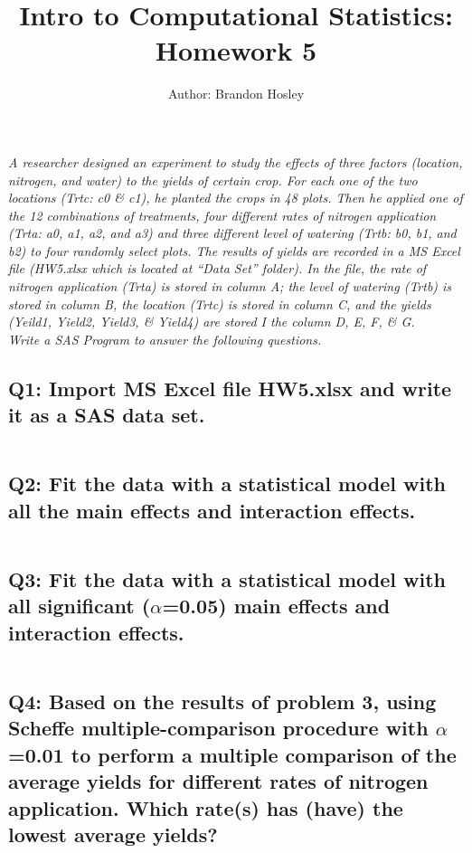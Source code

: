 \documentclass[a4paper,man,natbib]{apa6}
\title{Intro to Computational Statistics: Homework 5}
\author{Author: Brandon Hosley}
\affiliation{Instructor: Liang Kong, Ph.D}
\begin{document}
\maketitle
\singlespacing

\emph{A researcher designed an experiment to study the effects of three factors (location, nitrogen, and water) to the yields of certain crop. For each one of the two locations (Trtc: c0 \& c1), he planted the crops in 48 plots. Then he applied one of the 12 combinations of treatments, four different rates of nitrogen application (Trta: a0, a1, a2, and a3) and three different level of watering (Trtb: b0, b1, and b2) to four randomly select plots. The results of yields are recorded in a MS Excel file (HW5.xlsx which is located at “Data Set” folder). In the file, the rate of nitrogen application (Trta) is stored in column A; the level of watering (Trtb) is stored in column B, the location (Trtc) is stored in column C, and the yields (Yeild1, Yield2, Yield3, \& Yield4) are stored I the column D, E, F, \& G.
\\ Write a SAS Program to answer the following questions.
}
	
\subsection*{Q1: Import MS Excel file HW5.xlsx and write it as a SAS data set. }
\inputminted[breaklines,bgcolor=light-gray]{sas}{./Snippets/DAT502-HW5-1.sas}
% 

\subsection*{Q2: Fit the data with a statistical model with all the main effects and interaction effects. }
\inputminted[breaklines,bgcolor=light-gray]{sas}{./Snippets/DAT502-HW5-2.sas}
% 

\subsection*{Q3: Fit the data with a statistical model with all significant ($\alpha$=0.05) main effects and interaction effects. }
\inputminted[breaklines,bgcolor=light-gray]{sas}{./Snippets/DAT502-HW5-3.sas}
% 

\subsection*{Q4: Based on the results of problem 3, using Scheffe multiple-comparison procedure with $\alpha$=0.01 to perform a multiple comparison of the average yields for different rates of nitrogen application. Which rate(s) has (have) the lowest average yields? }
\inputminted[breaklines,bgcolor=light-gray]{sas}{./Snippets/DAT502-HW5-4.sas}
% 
\end{document}
